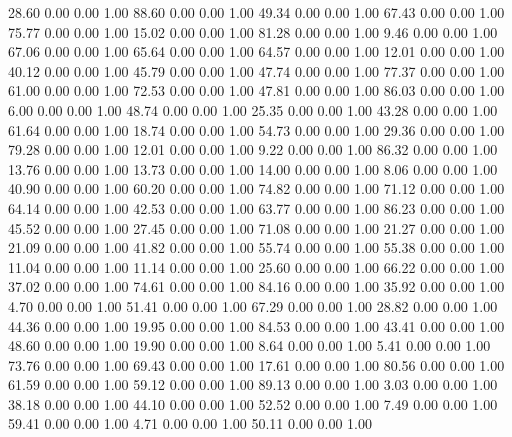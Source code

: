    28.60   0.00   0.00   1.00
   88.60   0.00   0.00   1.00
   49.34   0.00   0.00   1.00
   67.43   0.00   0.00   1.00
   75.77   0.00   0.00   1.00
   15.02   0.00   0.00   1.00
   81.28   0.00   0.00   1.00
    9.46   0.00   0.00   1.00
   67.06   0.00   0.00   1.00
   65.64   0.00   0.00   1.00
   64.57   0.00   0.00   1.00
   12.01   0.00   0.00   1.00
   40.12   0.00   0.00   1.00
   45.79   0.00   0.00   1.00
   47.74   0.00   0.00   1.00
   77.37   0.00   0.00   1.00
   61.00   0.00   0.00   1.00
   72.53   0.00   0.00   1.00
   47.81   0.00   0.00   1.00
   86.03   0.00   0.00   1.00
    6.00   0.00   0.00   1.00
   48.74   0.00   0.00   1.00
   25.35   0.00   0.00   1.00
   43.28   0.00   0.00   1.00
   61.64   0.00   0.00   1.00
   18.74   0.00   0.00   1.00
   54.73   0.00   0.00   1.00
   29.36   0.00   0.00   1.00
   79.28   0.00   0.00   1.00
   12.01   0.00   0.00   1.00
    9.22   0.00   0.00   1.00
   86.32   0.00   0.00   1.00
   13.76   0.00   0.00   1.00
   13.73   0.00   0.00   1.00
   14.00   0.00   0.00   1.00
    8.06   0.00   0.00   1.00
   40.90   0.00   0.00   1.00
   60.20   0.00   0.00   1.00
   74.82   0.00   0.00   1.00
   71.12   0.00   0.00   1.00
   64.14   0.00   0.00   1.00
   42.53   0.00   0.00   1.00
   63.77   0.00   0.00   1.00
   86.23   0.00   0.00   1.00
   45.52   0.00   0.00   1.00
   27.45   0.00   0.00   1.00
   71.08   0.00   0.00   1.00
   21.27   0.00   0.00   1.00
   21.09   0.00   0.00   1.00
   41.82   0.00   0.00   1.00
   55.74   0.00   0.00   1.00
   55.38   0.00   0.00   1.00
   11.04   0.00   0.00   1.00
   11.14   0.00   0.00   1.00
   25.60   0.00   0.00   1.00
   66.22   0.00   0.00   1.00
   37.02   0.00   0.00   1.00
   74.61   0.00   0.00   1.00
   84.16   0.00   0.00   1.00
   35.92   0.00   0.00   1.00
    4.70   0.00   0.00   1.00
   51.41   0.00   0.00   1.00
   67.29   0.00   0.00   1.00
   28.82   0.00   0.00   1.00
   44.36   0.00   0.00   1.00
   19.95   0.00   0.00   1.00
   84.53   0.00   0.00   1.00
   43.41   0.00   0.00   1.00
   48.60   0.00   0.00   1.00
   19.90   0.00   0.00   1.00
    8.64   0.00   0.00   1.00
    5.41   0.00   0.00   1.00
   73.76   0.00   0.00   1.00
   69.43   0.00   0.00   1.00
   17.61   0.00   0.00   1.00
   80.56   0.00   0.00   1.00
   61.59   0.00   0.00   1.00
   59.12   0.00   0.00   1.00
   89.13   0.00   0.00   1.00
    3.03   0.00   0.00   1.00
   38.18   0.00   0.00   1.00
   44.10   0.00   0.00   1.00
   52.52   0.00   0.00   1.00
    7.49   0.00   0.00   1.00
   59.41   0.00   0.00   1.00
    4.71   0.00   0.00   1.00
   50.11   0.00   0.00   1.00
